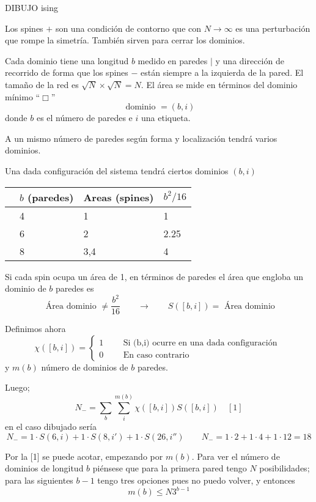 \documentclass[10pt,oneside]{CBFT_book}
\begin{document}
DIBUJO ising


Los spines $+$ son una condición de contorno que con $N\to\infty$ es una perturbación que rompe la
simetría. También sirven para cerrar los dominios.

Cada dominio tiene una longitud $b$ medido en paredes $|$ y una dirección de recorrido de forma que 
los spines $-$ están siempre a la izquierda de la pared.
El tamaño de la red es $\sqrt{N} \times \sqrt{N} = N$. El área se mide en términos del dominio 
mínimo ``$\Box$''
\[
	\text{ dominio } = (b,i)
\]
donde $b$ es el número de paredes e $i$ una etiqueta.

A un mismo número de paredes según forma y localización tendrá varios dominios.

Una dada configuración del sistema tendrá ciertos dominios $(b,i)$

\begin{center}
\begin{tabular}{llll}
 & $b$ (paredes) & Areas (spines) & $b^2/16$ \\
\hline
 & 4 & 1 & 1\\
 & 6 & 2 & 2.25\\
 & 8 & 3,4 & 4
\end{tabular}
\end{center}

Si cada spin ocupa un área de 1, en términos de paredes el área que engloba un dominio de $b$ paredes
es 
\[
	\text{ Área dominio } \neq \frac{b^2}{16} \qquad \rightarrow \qquad S([b,i]) = \text{ Área dominio}
\]

Definimos ahora 
\[
	\chi([b,i]) = \begin{cases}
	              1 \qquad \text{ Si (b,i) ocurre en una dada configuración } \\
	              0 \qquad \text{ En caso contrario}
	             \end{cases}
\]
y $m(b)$ número de dominios de $b$ paredes.

Luego;
\[
	\boxed{ N_- = \sum_b \sum_i^{m(b)} \chi([b,i]) S([b,i]) } \quad [1]
\]
en el caso dibujado sería
\[
	N_- = 1 \cdot S(6,i) + 1 \cdot S(8,i') + 1 \cdot S(26,i'') \qquad 
	N_- = 1 \cdot  2 + 1 \cdot  4 + 1 \cdot 12 = 18
\]

Por la [1] se puede acotar, empezando por $m(b)$. Para ver el número de dominios de longitud $b$ piénsese que 
para la primera pared tengo $N$ posibilidades; para las siguientes $b-1$ tengo tres opciones pues no puedo volver,
y entonces 
\[
	m(b) \leq N 3^{b-1}
\]
\end{document}
